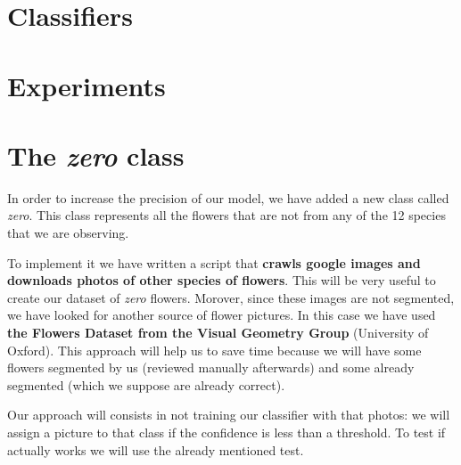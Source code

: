 \documentclass[11]{article}
\begin{document}
\section{Classifiers}

\section{Experiments}

\section{The \textit{zero} class}

In order to increase the precision of our model, we have added a new class called \textit{zero}. This class represents all the flowers that are not from any of the 12 species that we are observing.
\medskip

To implement it we have written a script that \textbf{crawls google images and downloads photos of other species of flowers}. This will be very useful to create our dataset of \textit{zero} flowers. Morover, since these images are not segmented, we have looked for another source of flower pictures. In this case we have used \textbf{the Flowers Dataset from the Visual Geometry Group} (University of Oxford). This approach will help us to save time because we will have some flowers segmented by us (reviewed manually afterwards) and some already segmented (which we suppose are already correct).
\medskip

Our approach will consists in not training our classifier with that photos: we will assign a picture to that class if the confidence is less than a threshold. To test if actually works we will use the already mentioned test. 
\end{document}
